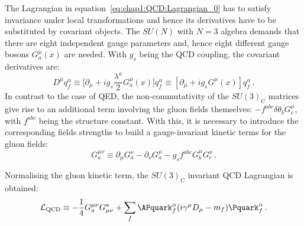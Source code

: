 The Lagrangian in equation~\ref{eq:chap1:QCD:Lagrangian_0} has to
satisfy invariance under local transformations and hence its derivatives have to be 
substituted by covariant objects. The $SU(N)$ with $N=3$ algebra demands that there are
eight independent gauge parameters and, hence eight different gauge
bosons $G_{a}^{\mu}(x)$ are needed. With $g_{s}$ being the QCD coupling, the
covariant derivatives are:
\begin{equation*}
	D^{\mu}q_{f}^{\alpha} \equiv \big[ \partial_{\mu}  + i g_{s} \frac{\lambda^{a}}{2} G_{a}^{\mu}(x) \big] q_{f}^{\alpha} \equiv [ \partial_{\mu}  + i g_{s} G^{\mu}(x) ] q_{f}^{\alpha} \, .
\end{equation*}
In contrast to the case of QED, the non-commutativity 
of the $SU(3)_\text{C}$ matrices give rise to an additional term involving the gluon 
fields themselves: $- f^{abc}\delta \theta_{b}G_{c}^{\mu}$, with $f^{abc}$ being the
structure constant. With this, it is necessary to introduce the corresponding fields 
strengths to build a gauge-invariant kinetic terms for the gluon fields:
\begin{equation*}
	G_{a}^{\mu \nu} \equiv \partial_{\mu}G^{\nu}_{a} - \partial_{\nu}G^{\mu}_{a} - g_{s} f^{abc} G_{b}^{\mu}G_{c}^{\nu}\, .
\end{equation*} 

Normalising the gluon kinetic term, 
the $SU(3)_\text{C}$ invariant QCD Lagrangian is obtained:
\begin{equation}
\label{eq:chap1:QCD:Lagrangian_FinalCompact}
	\mathcal{L}_{\text{QCD}} \equiv  -\frac{1}{4}G^{\mu \nu}_{a} G_{\mu \nu}^{a} + \sum_{f} \APquark_{f}^{\alpha} (i \gamma^{\mu} D_{\mu} - m_{f})\Pquark_{f}^{\alpha} \, .
\end{equation}




